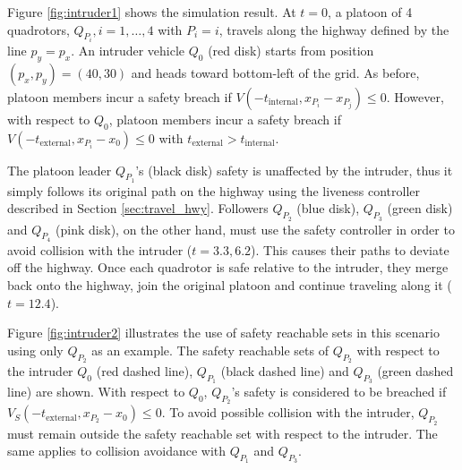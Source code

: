 Figure \ref{fig:intruder1} shows the simulation result. At $t=0$, a platoon of 4 quadrotors, $Q_{P_i},i=1,\ldots,4$ with $P_i = i$, travels along the highway defined by the line $p_y = p_x$. An intruder vehicle $Q_0$ (red disk) starts from position $(p_x, p_y) = (40,30)$ and heads toward bottom-left of the grid. As before, platoon members incur a safety breach if $V(-t_\text{internal},x_{P_i}-x_{P_j})\le 0$. However, with respect to $Q_0$, platoon members incur a safety breach if $V(-t_\text{external}, x_{P_i}-x_0) \le 0$ with $t_\text{external}>t_\text{internal}$. 

The platoon leader $Q_{P_1}$'s (black disk) safety is unaffected by the intruder, thus it simply follows its original path on the highway using the liveness controller described in Section \ref{sec:travel_hwy}. Followers $Q_{P_2}$ (blue disk), $Q_{P_3}$ (green disk) and $Q_{P_4}$ (pink disk), on the other hand, must use the safety controller in order to avoid collision with the intruder ($t=3.3,6.2$). This causes their paths to deviate off the highway. Once each quadrotor is safe relative to the intruder, they merge back onto the highway, join the original platoon and continue traveling along it ($t=12.4$).

Figure \ref{fig:intruder2} illustrates the use of safety reachable sets in this scenario using only $Q_{P_2}$ as an example. The safety reachable sets of $Q_{P_2}$ with respect to the intruder $Q_0$ (red dashed line), $Q_{P_1}$ (black dashed line) and $Q_{P_3}$ (green dashed line) are shown. With respect to $Q_0$, $Q_{P_2}$'s safety is considered to be breached if $V_S(-t_\text{external},x_{P_2}-x_0) \le 0$. To avoid possible collision with the intruder, $Q_{P_2}$ must remain outside the safety reachable set with respect to the intruder. The same applies to collision avoidance with $Q_{P_1}$ and $Q_{P_3}$. %

